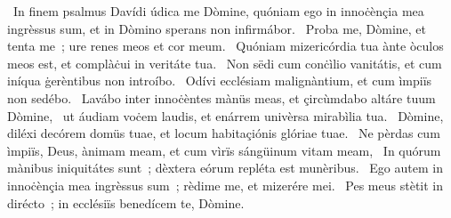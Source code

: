 {~In finem psalmus Davídi}
{%
údica me Dòmine, quóniam ego in innoċènçia mea ingrèssus sum, et in Dòmino sperans non infirmábor.
~Proba me, Dòmine, et tenta me~; ure renes meos et cor meum.
~Quóniam mizericórdia tua ànte òculos meos est, et complàċui in veritáte tua.
~Non sëdi cum conċìlio vanitátis, et cum iníqua ġerèntibus non introíbo.
~Odívi ecclésiam malignàntium, et cum ìmpiïs non sedébo.
~Lavábo inter innoċèntes mànüs meas, et çircùmdabo altáre tuum Dòmine,
~ut áudiam voċem laudis, et enárrem univèrsa mirabìlia tua.
~Dòmine, diléxi decórem domüs tuae, et locum habitaçiónis glóriae tuae.
~Ne pèrdas cum ìmpiïs, Deus, ànimam meam, et cum vìrïs sángüinum vitam meam,
~In quórum mànibus iniquitátes sunt~; dèxtera eórum repléta est munèribus.
~Ego autem in innoċènçia mea ingrèssus sum~; rèdime me, et mizerére mei.
~Pes meus stètit in dirécto~; in ecclésiïs benedícem te, Dòmine.}
